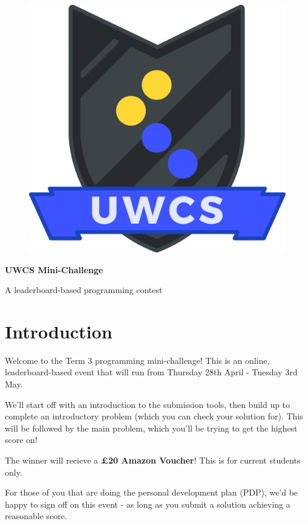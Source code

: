 \documentclass[a4paper,11pt,parskip=half-]{scrartcl}
\begin{document}
\begin{figure}
    \vspace{-10pt} %
    \includegraphics[width=0.8\linewidth]{shield.png} %
    \vspace{-100pt} %
\end{figure}

\normalfont \Huge \textbf{UWCS Mini-Challenge}

\normalfont\Large A leaderboard-based programming contest
\normalsize

\section*{Introduction}

Welcome to the Term 3 programming mini-challenge! 
This is an online, leaderboard-based event that will run from Thursday 28th April - Tuesday 3rd May.

We'll start off with an introduction to the submission tools, 
then build up to complete an introductory problem (which you can check your solution for).
This will be followed by the main problem, 
which you'll be trying to get the highest score on!

The winner will recieve a \textbf{£20 Amazon Voucher}! This is for current students only.

For those of you that are doing the personal development plan (PDP), we'd be happy to sign off on this event 
- as long as you submit a solution achieving a reasonable score.



\newpage



\newpage

\newpage

\end{document}
